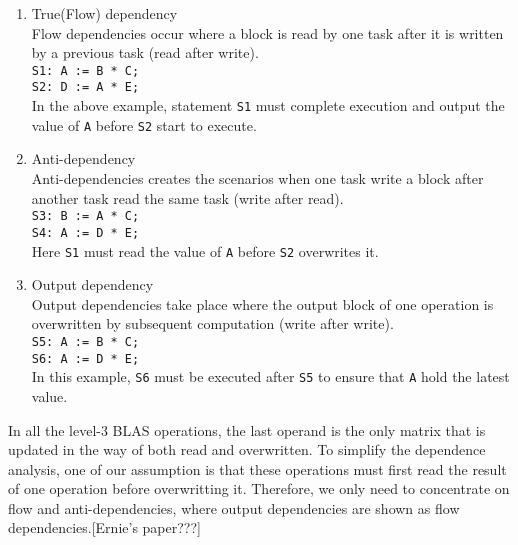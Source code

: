\documentclass[preprint,11pt]{elsarticle}
\begin{document}
\begin{enumerate}
	\item True(Flow) dependency\\
  Flow dependencies occur where a block is read by one task after it is written by a previous task (read after write).\\
  \texttt{S1: A := B * C;\\
  S2: D := A * E;\\}
  In the above example, statement \texttt{S1} must complete execution and output the value of \texttt{A} before \texttt{S2} start to execute.\\
\item Anti-dependency\\
  Anti-dependencies creates the scenarios when one task write a block after another task read the same task (write after read).\\
  \texttt{S3: B := A * C;\\
  S4: A := D * E;\\}
  Here \texttt{S1} must read the value of \texttt{A} before \texttt{S2} overwrites it.\\

\item Output dependency\\
  Output dependencies take place where the output block of one operation is overwritten by subsequent computation (write after write).\\
  \texttt{S5: A := B * C;\\
  S6: A := D * E;\\}
  In this example, \texttt{S6} must be executed after \texttt{S5} to ensure that \texttt{A} hold the latest value.\\
  \end{enumerate}
In all the level-3 BLAS operations, the last operand is the only matrix that is updated in the way of both read and overwritten. %
To simplify the dependence analysis, one of our assumption is that these operations must first read the result of one operation before overwritting it. Therefore, we only need to concentrate on flow and anti-dependencies, where output dependencies are shown as flow dependencies.[Ernie's paper???]\\

\end{document}
